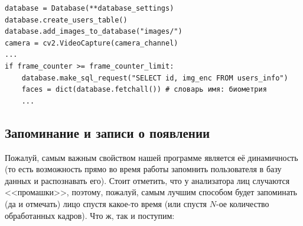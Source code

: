\documentclass[a4paper,hidelinks,14pt]{extarticle}
\begin{document}
	\begin{verbatim}
database = Database(**database_settings)
database.create_users_table()
database.add_images_to_database("images/")
camera = cv2.VideoCapture(camera_channel)
...
if frame_counter >= frame_counter_limit:
	database.make_sql_request("SELECT id, img_enc FROM users_info")
	faces = dict(database.fetchall()) # словарь имя: биометрия
	...
	\end{verbatim}
	 
	
	\subsection{Запоминание и записи о появлении}
	Пожалуй, самым важным свойством нашей программе является её динамичность (то есть возможность прямо во время работы запомнить пользователя в базу данных и распознавать его). Стоит отметить, что у анализатора лиц случаются <<промашки>>, поэтому, пожалуй, самым лучшим способом будет запоминать (да и отмечать) лицо спустя какое-то время (или спустя $N$-ое количество обработанных кадров). Что ж, так и поступим:
	
\end{document}

